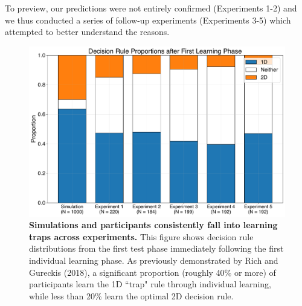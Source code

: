 \documentclass[11pt]{article} %
\begin{document}
To preview, our predictions were not entirely confirmed (Experiments 1-2) and we thus conducted a series of follow-up experiments (Experiments 3-5) which attempted to better understand the reasons.

\begin{figure}
    \centering
    \includegraphics[width=1.0 \linewidth]{first_test_overview.pdf}
    \caption{\textbf{Simulations and participants consistently fall into learning traps across experiments.} This figure shows decision rule distributions from the first test phase immediately following the first individual learning phase. As previously demonstrated by Rich and Gureckis (2018), a significant proportion (roughly 40\% or more) of participants learn the 1D ``trap" rule through individual learning, while less than 20\% learn the optimal 2D decision rule.}
    \label{fig:first-test}
\end{figure}
\end{document}
